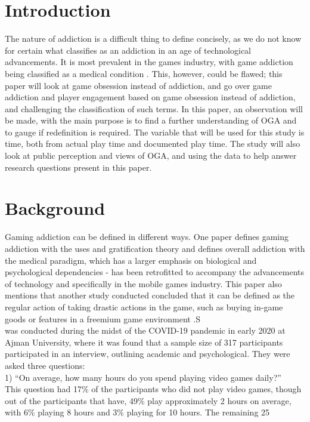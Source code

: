 \documentclass[conference]{IEEEtran}
\begin{document}
\section{Introduction}
The nature of addiction is a difficult thing to define concisely, as we do not know for certain what classifies as an addiction in an age of technological advancements. It is most prevalent in the games industry, with game addiction being classified as a medical condition \cite{NHSHamp24}. This, however, could be flawed; this paper will look at game obsession instead of addiction, and go over game addiction and player engagement based on game obsession instead of addiction, and challenging the classification of such terms. In this paper, an observation will be made, with the main purpose is to find a further understanding of OGA and to gauge if redefinition is required. The variable that will be used for this study is time, both from actual play time and documented play time. The study will also look at public perception and views of OGA, and using the data to help answer research questions present in this paper.

\section{Background}
Gaming addiction can be defined in different ways. One paper \cite{yasir2021} defines gaming addiction with the uses and gratification theory and defines overall addiction with the medical paradigm, which has a larger emphasis on biological and psychological dependencies - has been retrofitted to accompany the advancements of technology and specifically in the mobile games industry. This paper also mentions that another study conducted concluded that it can be defined as the regular action of taking drastic actions in the game, such as buying in-game goods or features in a freemium game environment \cite{XWang2021}.S \\

\cite{Naaj2021} was conducted during the midst of the COVID-19 pandemic in early 2020 at Ajman University, where it was found that a sample size of 317 participants participated in an interview, outlining academic and psychological. They were asked three questions: \\

1) “On average, how many hours do you spend playing video games daily?”\\

This question had 17\% of the participants who did not play video games, though out of the participants that have, 49\% play approximately 2 hours on average, with 6\% playing 8 hours and 3\% playing for 10 hours. The remaining 25%
\end{document}

